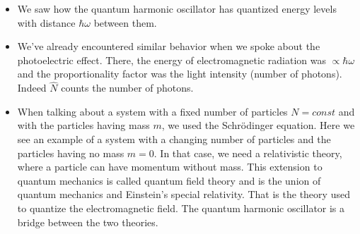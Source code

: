 \documentclass{Textbook}
\begin{document}
\begin{itemize}
\item We saw how the quantum harmonic oscillator has quantized energy levels with distance $\hbar \omega$ between them.
\item We've already encountered similar behavior when we spoke about the photoelectric effect. There, the energy of electromagnetic radiation was $\propto \hbar\omega$ and the proportionality factor was the light intensity (number of photons). Indeed $\hat{N}$ counts the number of photons.
\item When talking about a system with a fixed number of particles $N=const$ and with the particles having mass $m$, we used the Schr{\"o}dinger equation. Here we see an example of a system with a changing number of particles and the particles having no mass $m=0$. In that case, we need a relativistic theory, where a particle can have momentum without mass. This extension to quantum mechanics is called quantum field theory and is the union of quantum mechanics and Einstein's special relativity. That is the theory used to quantize the electromagnetic field. The quantum harmonic oscillator is a bridge between the two theories.
\end{itemize}
\end{document}
